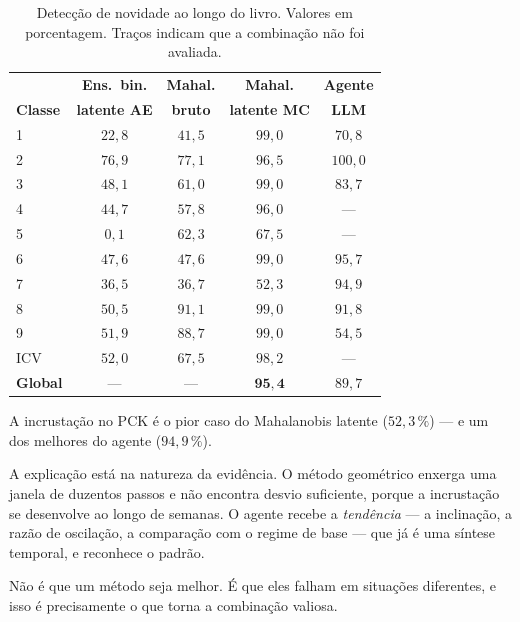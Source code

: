 \begin{table}[htbp]
\centering
\caption{Detecção de novidade ao longo do livro. Valores em porcentagem. Traços indicam
que a combinação não foi avaliada.}
\label{tab:sint-novidade}
\small
\begin{tabular}{lcccc}
\toprule
& \textbf{Ens.\ bin.} & \textbf{Mahal.} & \textbf{Mahal.} & \textbf{Agente} \\
\textbf{Classe} & \textbf{latente AE} & \textbf{bruto} & \textbf{latente MC} & \textbf{LLM} \\
\midrule
1 & $22{,}8$ & $41{,}5$ & $99{,}0$ & $70{,}8$ \\
2 & $76{,}9$ & $77{,}1$ & $96{,}5$ & $100{,}0$ \\
3 & $48{,}1$ & $61{,}0$ & $99{,}0$ & $83{,}7$ \\
4 & $44{,}7$ & $57{,}8$ & $96{,}0$ & --- \\
5 & $0{,}1$  & $62{,}3$ & $67{,}5$ & --- \\
6 & $47{,}6$ & $47{,}6$ & $99{,}0$ & $95{,}7$ \\
7 & $36{,}5$ & $36{,}7$ & $52{,}3$ & $94{,}9$ \\
8 & $50{,}5$ & $91{,}1$ & $99{,}0$ & $91{,}8$ \\
9 & $51{,}9$ & $88{,}7$ & $99{,}0$ & $54{,}5$ \\
ICV & $52{,}0$ & $67{,}5$ & $98{,}2$ & --- \\
\midrule
\textbf{Global} & --- & --- & $\bm{95{,}4}$ & $89{,}7$ \\
\bottomrule
\end{tabular}
\end{table}

\begin{destaque}
A incrustação no PCK é o pior caso do Mahalanobis latente ($52{,}3\,\%$) --- e um dos
melhores do agente ($94{,}9\,\%$).

A explicação está na natureza da evidência. O método geométrico enxerga uma janela de
duzentos passos e não encontra desvio suficiente, porque a incrustação se desenvolve ao
longo de semanas. O agente recebe a \emph{tendência} --- a inclinação, a razão de
oscilação, a comparação com o regime de base --- que já é uma síntese temporal, e
reconhece o padrão.

Não é que um método seja melhor. É que eles falham em situações diferentes, e isso é
precisamente o que torna a combinação valiosa.
\end{destaque}

